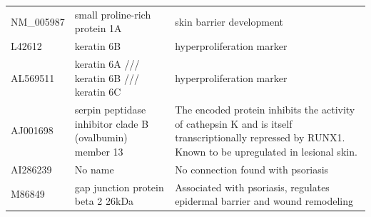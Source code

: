 \documentclass[10pt,a4paper]{article}
\begin{document}
\begin{table}[]
\begin{tabular}{l|p{4.5cm} p{8.5cm}}
		NM\_005987         & small proline-rich protein 1A                                                                                           & skin barrier development\cite{bergboer2012genetics}                                                                                                                                                                                                                    \\
		L42612             & keratin 6B                                                                                                              & hyperproliferation marker\cite{jiang2015biomarkers}                                                                                                                                                                                                                  \\
		AL569511           & keratin 6A /// keratin 6B /// keratin 6C                                                                                & hyperproliferation marker\cite{jiang2015biomarkers}                                                                                                                                                                                                                  \\
		AJ001698           & serpin peptidase inhibitor  clade B (ovalbumin) member 13                                                               & The encoded protein inhibits the activity of cathepsin K and is itself transcriptionally repressed by RUNX1. Known to be upregulated in lesional skin.\cite{suarez2012expanding}                                                                                    \\
		AI286239           &  No name                                                                                                                       &   No connection found with psoriasis                                                                                                                                                                                                                                        \\
		M86849             & gap junction protein beta 2 26kDa                                                                                       & Associated with psoriasis, regulates epidermal barrier and wound remodeling\cite{sun2010association, djalilian2006connexin}                                                                                                                                                               \\

\end{tabular}
\end{table}
\end{document}
